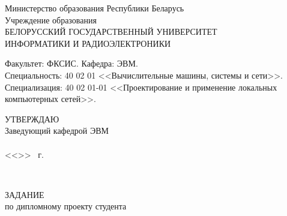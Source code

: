 
    \begin{center}
      Министерство образования Республики Беларусь\\[1em]
      Учреждение образования\\
      БЕЛОРУССКИЙ ГОСУДАРСТВЕННЫЙ УНИВЕРСИТЕТ \\
      ИНФОРМАТИКИ И РАДИОЭЛЕКТРОНИКИ\\[1em]
    \end{center}
      Факультет: ФКСИС. Кафедра: ЭВМ. \\
      Специальность: 40 02 01 <<Вычислительные машины, системы и сети>>. \\
      Специализация: 40 02 01-01 <<Проектирование и применение локальных
      компьютерных сетей>>.

      \begin{flushright}
        \begin{minipage}{0.4\textwidth}
          \MakeUppercase{Утверждаю}\\
          Заведующий кафедрой ЭВМ\\
          \underline{\hspace*{2.2cm}} \headOfDepartmentShort \\
          <<\underline{\hspace*{1cm}}>> \underline{\hspace*{2.5cm}} \targetYear\ г.
        \end{minipage}\\[1em]
      \end{flushright}

    \begin{center}
      {ЗАДАНИЕ}\\
      {по дипломному проекту студента}\\
      {\studentFullParental}\\[1em]
    \end{center}

